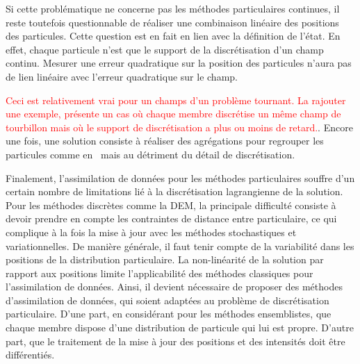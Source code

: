 Si cette problématique ne concerne pas les méthodes particulaires continues, il reste toutefois questionnable de réaliser une combinaison linéaire des positions des particules. Cette question est en fait en lien avec la définition de l'état. En effet, chaque particule n'est que le support de la discrétisation d'un champ continu. Mesurer une erreur quadratique sur la position des particules n'aura pas de lien linéaire avec l'erreur quadratique sur le champ.

\textcolor{red}{Ceci est relativement vrai pour un champs d'un problème tournant. La rajouter une exemple, présente un cas où chaque membre discrétise un même champ de tourbillon mais où le support de discrétisation a plus ou moins de retard.}.
Encore une fois, une solution consiste à réaliser des agrégations pour regrouper les particules comme en~\cite{chen_superfloe_2022,darakananda_data-assimilated_2018} mais au détriment du détail de discrétisation.


Finalement, l'assimilation de données pour les méthodes particulaires souffre d'un certain nombre de limitations lié à la discrétisation lagrangienne de la solution. Pour les méthodes discrètes comme la DEM, la principale difficulté consiste à devoir prendre en compte les contraintes de distance entre particulaire, ce qui complique à la fois la mise à jour avec les méthodes stochastiques et variationnelles. De manière générale, il faut tenir compte de la variabilité dans les positions de la distribution particulaire. La non-linéarité de la solution par rapport aux positions limite l'applicabilité des méthodes classiques pour l'assimilation de données. Ainsi, il devient nécessaire de proposer des méthodes d'assimilation de données, qui soient adaptées au problème de discrétisation particulaire. D'une part, en considérant pour les méthodes ensemblistes, que chaque membre dispose d'une distribution de particule qui lui est propre. D'autre part, que le traitement de la mise à jour des positions et des intensités doit être différentiés.

